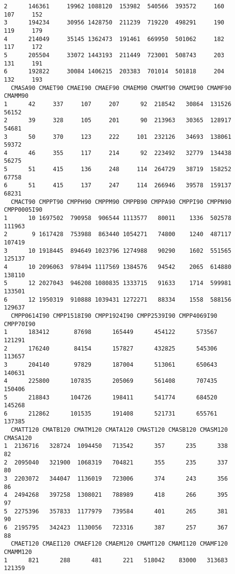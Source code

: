 \documentclass[
  letterpaper,
  DIV=11,
  numbers=noendperiod]{scrreprt}
\begin{document}
\begin{verbatim}
2      146361     19962 1088120  153982  540566  393572     160     107     152
3      194234     30956 1428750  211239  719220  498291     190     119     179
4      214049     35145 1362473  191461  669950  501062     182     117     172
5      205504     33072 1443193  211449  723001  508743     203     131     191
6      192822     30084 1406215  203383  701014  501818     204     132     193
  CMASA90 CMAET90 CMAEI90 CMAEF90 CMAEM90 CMAMT90 CMAMI90 CMAMF90 CMAMM90
1      42     337     107     207      92  218542   30864  131526   56152
2      39     328     105     201      90  213963   30365  128917   54681
3      50     370     123     222     101  232126   34693  138061   59372
4      46     355     117     214      92  223492   32779  134438   56275
5      51     415     136     248     114  264729   38719  158252   67758
6      51     415     137     247     114  266946   39578  159137   68231
  CMACT90 CMPPT90 CMPPH90 CMPPM90 CMPPB90 CMPPA90 CMPPI90 CMPPN90 CMPP0005I90
1      10 1697502  790958  906544 1113577   80011    1336  502578      111963
2       9 1617428  753988  863440 1054271   74800    1240  487117      107419
3      10 1918445  894649 1023796 1274988   90290    1602  551565      125137
4      10 2096063  978494 1117569 1384576   94542    2065  614880      138110
5      12 2027043  946208 1080835 1333715   91633    1714  599981      133501
6      12 1950319  910888 1039431 1272271   88334    1558  588156      129637
  CMPP0614I90 CMPP1518I90 CMPP1924I90 CMPP2539I90 CMPP4069I90 CMPP70I90
1      183412       87698      165449      454122      573567    121291
2      176240       84154      157827      432825      545306    113657
3      204140       97829      187004      513061      650643    140631
4      225800      107835      205069      561408      707435    150406
5      218843      104726      198411      541774      684520    145268
6      212862      101535      191408      521731      655761    137385
  CMATT120 CMATB120 CMATM120 CMATA120 CMAST120 CMASB120 CMASM120 CMASA120
1  2136716   328724  1094450   713542      357      235      338       82
2  2095040   321900  1068319   704821      355      235      337       80
3  2203072   344047  1136019   723006      374      243      356       86
4  2494268   397258  1308021   788989      418      266      395       97
5  2275396   357833  1177979   739584      401      265      381       90
6  2195795   342423  1130056   723316      387      257      367       88
  CMAET120 CMAEI120 CMAEF120 CMAEM120 CMAMT120 CMAMI120 CMAMF120 CMAMM120
1      821      288      481      221   518042    83000   313683   121359

\end{verbatim}
\end{document}
